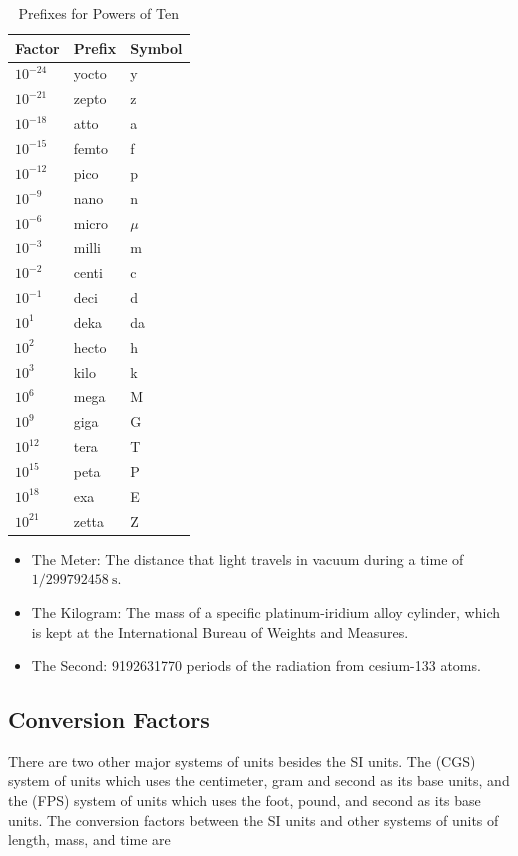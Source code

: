 \documentclass[10pt]{article}
\numberwithin{equation}{section}
\begin{document}
\begin{table}[htbp]
\centering
\begin{tabular}{l|l|l}
\hline
Factor & Prefix & Symbol \\
\hline
$10^{-24}$ & yocto & y \\
\hline
$10^{-21}$ & zepto & z \\
\hline
$10^{-18}$ & atto & a \\
\hline
$10^{-15}$ & femto & f \\
\hline
$10^{-12}$ & pico & p \\
\hline
$10^{-9}$ & nano & n \\
\hline
$10^{-6}$ & micro & $\mu$ \\
\hline
$10^{-3}$ & milli & m \\
\hline
$10^{-2}$ & centi & c \\
\hline
$10^{-1}$ & deci & d \\
\hline
$10^{1}$ & deka & da \\
\hline
$10^{2}$ & hecto & h \\
\hline
$10^{3}$ & kilo & k \\
\hline
$10^{6}$ & mega & M \\
\hline
$10^{9}$ & giga & G \\
\hline
$10^{12}$ & tera & T \\
\hline
$10^{15}$ & peta & P \\
\hline
$10^{18}$ & exa & E \\
\hline
$10^{21}$ & zetta & Z \\
\hline
\end{tabular}
\caption{Prefixes for Powers of Ten}\label{tab:1-2}
\end{table}

\begin{itemize}
  \item The Meter: The distance that light travels in vacuum during a time of $1 / 299792458 \mathrm{~s}$.
  \item The Kilogram: The mass of a specific platinum-iridium alloy cylinder, which is kept at the International Bureau of Weights and Measures.
  \item The Second: 9192631770 periods of the radiation from cesium-133 atoms.
\end{itemize}

\subsection{Conversion Factors}\label{sec:1-3}
There are two other major systems of units besides the SI units. The (CGS) system of units which uses the centimeter, gram and second as its base units, and the (FPS) system of units which uses the foot, pound, and second as its base units. The conversion factors between the SI units and other systems of units of length, mass, and time are
\end{document}
